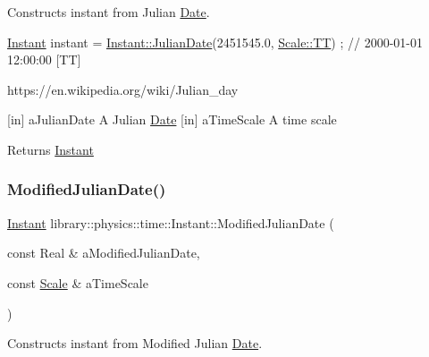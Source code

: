 Constructs instant from Julian \hyperlink{classlibrary_1_1physics_1_1time_1_1_date}{Date}. 


\begin{DoxyCode}
\hyperlink{classlibrary_1_1physics_1_1time_1_1_instant_a7916a9d8acb9de4eda35f9d72086a618}{Instant} instant = \hyperlink{classlibrary_1_1physics_1_1time_1_1_instant_a06f5e092a3a5ee126c9521c12e349d56}{Instant::JulianDate}(2451545.0, 
      \hyperlink{namespacelibrary_1_1physics_1_1time_a09d2bc9fbc7b0b5f92e1419bd655e6bbadf1f3edb9115acb0a1e04209b7a9937b}{Scale::TT}) ; \textcolor{comment}{// 2000-01-01 12:00:00 [TT]}
\end{DoxyCode}


https\+://en.wikipedia.\+org/wiki/\+Julian\+\_\+day

\mbox{[}in\mbox{]} a\+Julian\+Date A Julian \hyperlink{classlibrary_1_1physics_1_1time_1_1_date}{Date}  \mbox{[}in\mbox{]} a\+Time\+Scale A time scale \begin{DoxyReturn}{Returns}
\hyperlink{classlibrary_1_1physics_1_1time_1_1_instant}{Instant} 
\end{DoxyReturn}
\mbox{\label{classlibrary_1_1physics_1_1time_1_1_instant_a800d784f67ed5eaa6432b71f4534a170}} 
\subsubsection{\texorpdfstring{Modified\+Julian\+Date()}{ModifiedJulianDate()}}
{\footnotesize\ttfamily \hyperlink{classlibrary_1_1physics_1_1time_1_1_instant}{Instant} library\+::physics\+::time\+::\+Instant\+::\+Modified\+Julian\+Date (\begin{DoxyParamCaption}\item[{const Real \&}]{a\+Modified\+Julian\+Date,  }\item[{const \hyperlink{namespacelibrary_1_1physics_1_1time_a09d2bc9fbc7b0b5f92e1419bd655e6bb}{Scale} \&}]{a\+Time\+Scale }\end{DoxyParamCaption})\hspace{0.3cm}{\ttfamily [static]}}



Constructs instant from Modified Julian \hyperlink{classlibrary_1_1physics_1_1time_1_1_date}{Date}. 


